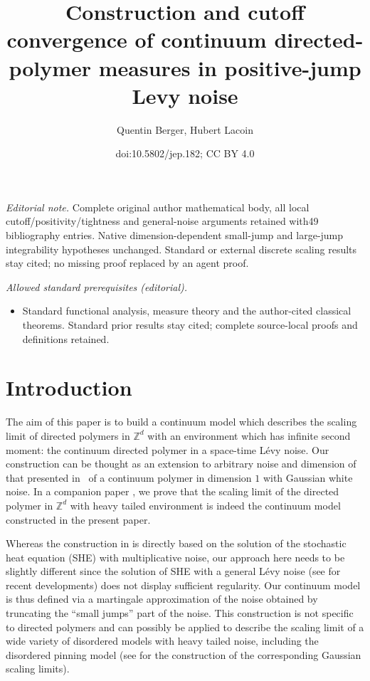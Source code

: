 \documentclass[10pt]{amsart}
\title{Construction and cutoff convergence of continuum directed-polymer measures in positive-jump Levy noise}
\author{Quentin Berger, Hubert Lacoin}
\date{doi:10.5802/jep.182; CC BY 4.0}
\theoremstyle{definition}
\newcommand{\bbZ}{{\ensuremath{\mathbb Z}} }
\begin{document}
\maketitle
\noindent\textit{Editorial note.} Complete original author mathematical body, all local cutoff/positivity/tightness and general-noise arguments retained with49 bibliography entries. Native dimension-dependent small-jump and large-jump integrability hypotheses unchanged. Standard or external discrete scaling results stay cited; no missing proof replaced by an agent proof.\par\medskip
\noindent\textit{Allowed standard prerequisites (editorial).}\begin{itemize}
\item Standard functional analysis, measure theory and the author-cited classical theorems. Standard prior results stay cited; complete source-local proofs and definitions retained.
\end{itemize}\medskip
\vspace*{-\baselineskip}
\enlargethispage{.5\baselineskip}
{\let\\ \relax \tableofcontents}


\section{Introduction}

The aim of this paper is to build a continuum model which describes the scaling limit of directed polymers in $\bbZ^d$ with an environment which has infinite second moment:
the continuum directed polymer in a space-time Lévy noise.
Our construction can be thought as an extension to arbitrary noise and dimension of that presented in~\cite{AKQ14b} of a continuum polymer in dimension $1$ with Gaussian white noise.
In a companion paper \cite{BL20_disc}, we prove that the scaling limit of the directed polymer in $\bbZ^d$ with heavy tailed environment is indeed the continuum model constructed in the present paper.

Whereas the construction in \cite{AKQ14b} is directly based on the solution of the stochastic heat equation (SHE) with multiplicative noise, our approach here needs to be slightly different since the solution of SHE with a general Lévy noise (see \cite{Chong17} for recent developments) does not display sufficient regularity. Our continuum model is thus defined via a martingale approximation of the noise obtained by truncating the ``small jumps'' part of the noise. This construction is not specific to directed polymers and can possibly be applied to describe the scaling limit of a wide variety of disordered models with heavy tailed noise, including the disordered pinning model (see \cite{CSZ14,CSZ13} for the construction of the corresponding Gaussian scaling limits).
\end{document}
